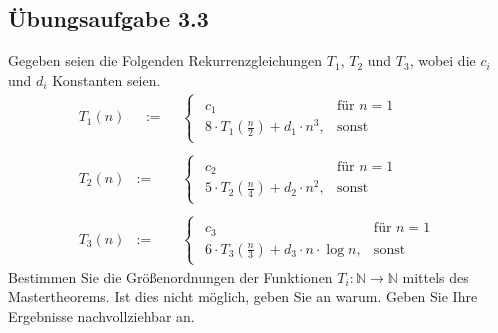 \documentclass{article}
\begin{document}
\subsection{Übungsaufgabe 3.3}
\begin{flushright}
\begin{Large}
[~~~~\string| ~~3~]
\end{Large}
\end{flushright}
Gegeben seien die Folgenden Rekurrenzgleichungen $T_1$, $T_2$ und $T_3$, wobei die $c_i$ und $d_i$ Konstanten seien.
\[
\begin{array}{lll}
	T_1(n) &~~~:=~~~& \begin{cases}
					\begin{array}{ll}
						c_1	&	\text{für }n=1\\
						8\cdot T_1(\frac{n}{2})+d_1\cdot n^3, & \text{sonst}
					\end{array}
				\end{cases}
\\\\
	T_2(n) &:=& \begin{cases}
					\begin{array}{ll}
						c_2	&	\text{für }n=1\\
						5\cdot T_2(\frac{n}{4})+d_2\cdot n^2, & \text{sonst}
					\end{array}
				\end{cases}
\\\\
	T_3(n) &:=& \begin{cases}
					\begin{array}{ll}
						c_3	&	\text{für }n=1\\
						6\cdot T_3(\frac{n}{3})+d_3\cdot n\cdot \operatorname{log} n, & \text{sonst}
					\end{array}
				\end{cases}
\end{array}
\]
Bestimmen Sie die Größenordnungen der Funktionen $T_i:\mathbb{N}\rightarrow\mathbb{N}$ mittels des Mastertheorems.
Ist dies nicht möglich, geben Sie an warum.
Geben Sie Ihre Ergebnisse nachvollziehbar an.
\vspace{1cm}\-\\
\end{document}
